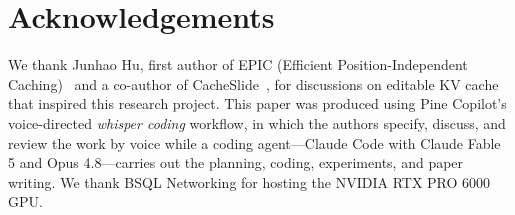 \section*{Acknowledgements}
We thank Junhao Hu, first author of EPIC (Efficient Position-Independent Caching)~\citep{hu2025epic}
and a co-author of CacheSlide~\citep{liu2026cacheslide}, for discussions on editable KV cache that
inspired this research project.
This paper was produced using Pine Copilot's voice-directed \emph{whisper coding} workflow, in which the authors specify, discuss, and review the work by voice while a coding agent---Claude Code with Claude Fable 5 and Opus 4.8---carries out the planning, coding, experiments, and paper writing.
We thank BSQL Networking for hosting the NVIDIA RTX PRO 6000 GPU.
